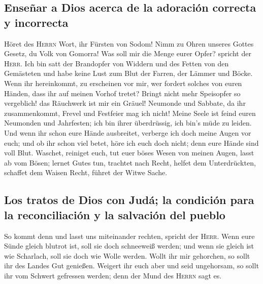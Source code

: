 \hypertarget{enseuxf1ar-a-dios-acerca-de-la-adoraciuxf3n-correcta-y-incorrecta}{%
\subsection{Enseñar a Dios acerca de la adoración correcta y
incorrecta}\label{enseuxf1ar-a-dios-acerca-de-la-adoraciuxf3n-correcta-y-incorrecta}}

 Höret des \textsc{Herrn} Wort, ihr Fürsten von Sodom!
Nimm zu Ohren unseres Gottes Gesetz, du Volk von Gomorra!
 Was soll mir die Menge eurer Opfer? spricht der
\textsc{Herr}. Ich bin satt der Brandopfer von Widdern und des Fetten
von den Gemästeten und habe keine Lust zum Blut der Farren, der Lämmer
und Böcke.  Wenn ihr hereinkommt, zu erscheinen vor mir,
wer fordert solches von euren Händen, dass ihr auf meinen Vorhof tretet?
 Bringt nicht mehr Speisopfer so vergeblich! das
Räuchwerk ist mir ein Gräuel! Neumonde und Sabbate, da ihr
zusammenkommt, Frevel und Festfeier mag ich nicht!  Meine
Seele ist feind euren Neumonden und Jahrfesten; ich bin ihrer
überdrüssig, ich bin's müde zu leiden.  Und wenn ihr
schon eure Hände ausbreitet, verberge ich doch meine Augen vor euch; und
ob ihr schon viel betet, höre ich euch doch nicht; denn eure Hände sind
voll Blut.  Waschet, reiniget euch, tut euer böses Wesen
von meinen Augen, lasst ab vom Bösen;  lernet Gutes tun,
trachtet nach Recht, helfet dem Unterdrückten, schaffet dem Waisen
Recht, führet der Witwe Sache.

\hypertarget{los-tratos-de-dios-con-juduxe1-la-condiciuxf3n-para-la-reconciliaciuxf3n-y-la-salvaciuxf3n-del-pueblo}{%
\subsection{Los tratos de Dios con Judá; la condición para la
reconciliación y la salvación del
pueblo}\label{los-tratos-de-dios-con-juduxe1-la-condiciuxf3n-para-la-reconciliaciuxf3n-y-la-salvaciuxf3n-del-pueblo}}

 So kommt denn und lasst uns miteinander rechten, spricht
der \textsc{Herr}. Wenn eure Sünde gleich blutrot ist, soll sie doch
schneeweiß werden; und wenn sie gleich ist wie Scharlach, soll sie doch
wie Wolle werden.  Wollt ihr mir gehorchen, so sollt ihr
des Landes Gut genießen.  Weigert ihr euch aber und seid
ungehorsam, so sollt ihr vom Schwert gefressen werden; denn der Mund des
\textsc{Herrn} sagt es.

